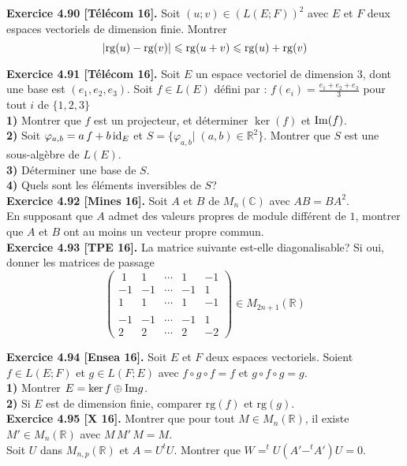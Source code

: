 \documentclass[a4paper,12pt,francais]{article}
\newcommand{\field}[1]{\mathbb{#1}}
\newcommand{\R}{\field{R}}
\newcommand{\C}{\field{C}}
\newcommand{\rg}{\mbox{rg}}
\begin{document}
\noindent
{\bf Exercice 4.90 [Télécom 16]. }%
Soit $(u;v)\in (L(E;F))^2$ avec $E$ et $F$ deux espaces vectoriels de dimension finie. Montrer 
$$|{\rm rg}(u)- {\rm rg}(v)| \leqslant {\rm rg}(u+v) \leqslant {\rm rg}(u)+{\rm rg}(v)$$

\noindent
{\bf Exercice 4.91 [Télécom 16]. } %
Soit $E$ un espace vectoriel de dimension $3$, dont une base est $(e_1 , e_2 , e_3)$. Soit $f \in L(E)$ défini par :
$f(e_i ) =\frac{ e_1 + e_2 + e_3}{3}$ pour tout $i$ de $\{1,2,3\}$\\
{\bf 1)} Montrer que $f$ est un projecteur, et déterminer $\ker(f)$ et ${\rm Im}(f)$.\\
{\bf 2)} Soit $\varphi_{a,b} = a \, f + b \, {\rm id}_E$ et $S = \{\varphi_{a,b}  | \; (a, b) \in \R^2 \}$. Montrer que $S$ est
une sous-algèbre de $L(E)$.\\
{\bf 3)} Déterminer une base de $S$.\\
{\bf 4)} Quels sont les éléments inversibles de $S$?\\

\noindent
{\bf Exercice 4.92 [Mines 16]. } %
Soit $A$ et $B$ de $M_n(\C)$ avec $AB=BA^2$.\\ 
En supposant que $A$ admet des valeurs propres de module différent de $1$, montrer que $A$ et $B$ ont au moins un vecteur propre commun.\\

\noindent
{\bf Exercice 4.93 [TPE 16]. } %
La matrice suivante est-elle diagonalisable? Si oui, donner les matrices de passage
$$\left({
\begin{array}{ccccc}
\; 1\;&1& \cdots &1&-1\\
-1&-1& \cdots &-1&1\\
1&1& \cdots &1&-1\\
&&&&\\
-1&-1& \cdots &-1&1\\
2&2& \cdots &2&-2
\end{array}} \right) \in M_{2n+1}(\R)$$

\noindent
{\bf Exercice 4.94 [Ensea 16]. } %
Soit $E$ et $F$ deux espaces vectoriels. Soient $f \in L(E;F)$ et $g \in L(F;E)$ avec $f \circ g \circ f =f$ et $g \circ f \circ g =g$.\\
{\bf 1)} Montrer $E= \ker f \oplus {\rm Im} g $.\\
{\bf 2)} Si $E$ est de dimension finie, comparer $\rg(f)$ et $\rg(g)$.\\

\noindent
{\bf Exercice 4.95 [X 16]. } %
Montrer que pour tout $M \in M_n(\R)$, il existe $M' \in M_n(\R)$ avec $M \, M' \, M=M$.\\
Soit $U$ dans $M_{n,p}(\R)$ et $A=U ^tU$. Montrer que $W=^t\!U(A'-^t\!A')U=0$.\\
\end{document}
